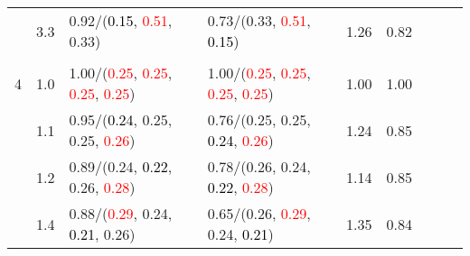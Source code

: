 \documentclass[10pt,a4paper]{report}
\begin{document}
\begin{table}[!htbp]
\begin{center}
{\begin{tabular}{ccllccccc}
				  & 3.3                               & 0.92/(\textcolor{black}{0.15}, \textcolor{red}{0.51}, 0.33)                                                                                                                                   & 0.73/(0.33, \textcolor{red}{0.51}, \textcolor{black}{0.15})                                                                                                                                   & 1.26             & 0.82                     \\
				  &                                   &                                                                                                                                                                                               &                                                                                                                                                                                               &                                             \\
				4 & 1.0                               & 1.00/(\textcolor{red}{0.25}, \textcolor{red}{0.25}, \textcolor{red}{0.25}, \textcolor{red}{0.25})                                                                                             & 1.00/(\textcolor{red}{0.25}, \textcolor{red}{0.25}, \textcolor{red}{0.25}, \textcolor{red}{0.25})                                                                                             & 1.00             & 1.00                     \\
				  & 1.1                               & 0.95/(\textcolor{black}{0.24}, 0.25, 0.25, \textcolor{red}{0.26})                                                                                                                             & 0.76/(0.25, 0.25, \textcolor{black}{0.24}, \textcolor{red}{0.26})                                                                                                                             & 1.24             & 0.85                     \\
				  & 1.2                               & 0.89/(0.24, \textcolor{black}{0.22}, 0.26, \textcolor{red}{0.28})                                                                                                                             & 0.78/(0.26, 0.24, \textcolor{black}{0.22}, \textcolor{red}{0.28})                                                                                                                             & 1.14             & 0.85                     \\
				  & 1.4                               & 0.88/(\textcolor{red}{0.29}, 0.24, \textcolor{black}{0.21}, 0.26)                                                                                                                             & 0.65/(0.26, \textcolor{red}{0.29}, 0.24, \textcolor{black}{0.21})                                                                                                                             & 1.35             & 0.84                     \\

\end{tabular}}
\end{center}
\end{table}
\end{document}
